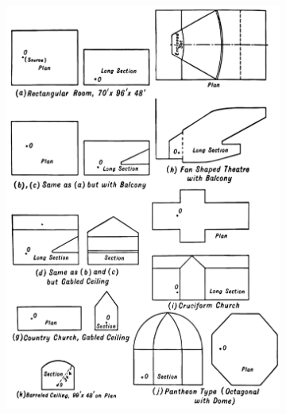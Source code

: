 \begin{figure}[ht]
    \centering
    \begin{subfigure}[b]{0.48\textwidth}
    	\centering
        \includegraphics[width=0.9\linewidth]{archivos/mfpknudsen1.pdf}
        \caption{}
        \label{fig:knudsen1}

\end{subfigure}
\end{figure}
